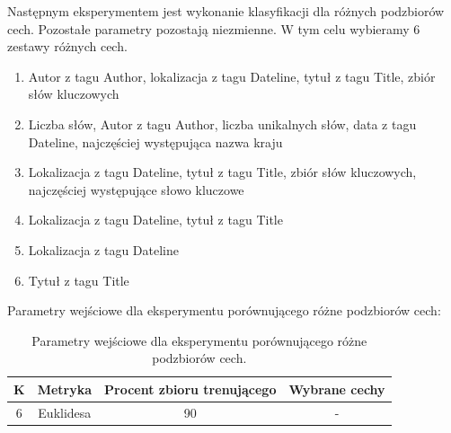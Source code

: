 \documentclass{classrep}
\begin{document}
Następnym eksperymentem jest wykonanie klasyfikacji dla różnych podzbiorów cech. Pozostałe parametry pozostają niezmienne. W tym celu wybieramy 6 zestawy różnych cech. 

\begin{enumerate}
\item Autor z tagu Author, lokalizacja z tagu Dateline, tytuł z tagu Title, zbiór słów kluczowych
\item Liczba słów, Autor z tagu Author, liczba unikalnych słów, data z tagu Dateline, najczęściej występująca nazwa kraju
\item Lokalizacja z tagu Dateline, tytuł z tagu Title, zbiór słów kluczowych, najczęściej występujące słowo kluczowe
\item Lokalizacja z tagu Dateline, tytuł z tagu Title
\item Lokalizacja z tagu Dateline
\item Tytuł z tagu Title
\end{enumerate}

Parametry wejściowe dla eksperymentu porównującego różne podzbiorów cech:
 
\begin{table}[h!]
\caption{Parametry wejściowe dla eksperymentu porównującego różne podzbiorów cech. }
\centering
\vspace{0.1cm}
 \begin{tabular}{c c c c}
    \textbf{K} & \textbf{Metryka}   & \textbf{Procent zbioru trenującego}  & \textbf{Wybrane cechy}   \\
\hline
6 & Euklidesa & 90 & -\\
\end {tabular}
\label {Parametry wejściowe dla eksperymentu porównującego różne podzbiorów cech. }
\end{table}
\end{document}
